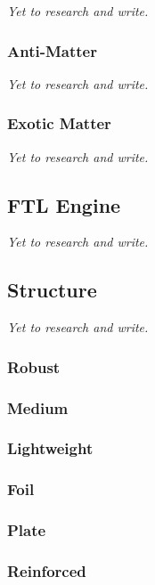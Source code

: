 \textit{Yet to research and write.}

\subsubsection{Anti-Matter}

\textit{Yet to research and write.}

\subsubsection{Exotic Matter}

\textit{Yet to research and write.}

\subsection{FTL Engine}

\textit{Yet to research and write.}

\subsection{Structure}

\textit{Yet to research and write.}

\subsubsection{Robust}

\subsubsection{Medium}

\subsubsection{Lightweight}

\subsubsection{Foil}

\subsubsection{Plate}

\subsubsection{Reinforced}

